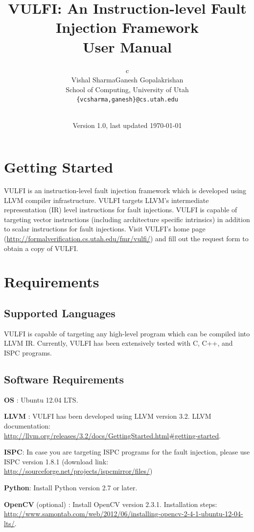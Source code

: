 \documentclass[12pt,a4paper]{article}
\title{
  VULFI: An Instruction-level Fault Injection Framework\\{\large User Manual}
}
\author{
 \begin{tabular}{c}
  \begin{tabular}{cc}
   Vishal Sharma &
   Ganesh Gopalakrishan  \\
    \multicolumn{2}{c}{\scriptsize School of Computing, University of Utah} \\
   \multicolumn{2}{c}{\scriptsize \texttt{\{vcsharma,ganesh\}@cs.utah.edu}} \\
  \end{tabular}\\
 \end{tabular}
}
\date{\small Version 1.0, last updated \today\\
      }
\begin{document}
\maketitle

\newpage

\tableofcontents

\newpage

\section{Getting Started}
\label{started}
VULFI is an instruction-level fault injection framework which is developed using LLVM compiler infrastructure\cite{lattner2004,llvmwebref}.
%
VULFI targets LLVM's intermediate representation (IR) level instructions for fault injections.
%
VULFI is capable of targeting vector instructions (including architecture specific intrinsics) in addition to scalar instructions
for fault injections.
%
Visit VULFI's home page (\url{http://formalverification.cs.utah.edu/fmr/vulfi/}) and fill out the request form to obtain a copy 
of VULFI.

\section{Requirements}
\label{prereq}

\subsection{Supported Languages}
\label{lang}
VULFI is capable of targeting any high-level program which can be compiled into LLVM IR. Currently, VULFI has been extensively tested 
with C, C++, and ISPC programs.

\subsection{Software Requirements}
\label{softreq}
\begin{compactitem}
\item \textbf{OS} : Ubuntu 12.04 LTS.

 \item \textbf{LLVM} : VULFI has been developed using LLVM version 3.2. LLVM documentation:\\ \url{http://llvm.org/releases/3.2/docs/GettingStarted.html#getting-started}.
 
 \item \textbf{ISPC}: In case you are targeting ISPC programs for the fault injection, please use ISPC 
 version 1.8.1 (download link: \url{http://sourceforge.net/projects/ispcmirror/files/}) 
 
 \item \textbf{Python}: Install Python version 2.7 or later.
 
 \item \textbf{OpenCV} (optional) : Install OpenCV version 2.3.1. Installation steps: \\
 \url{http://www.samontab.com/web/2012/06/installing-opencv-2-4-1-ubuntu-12-04-lts/}.
\end{compactitem}
\end{document}
